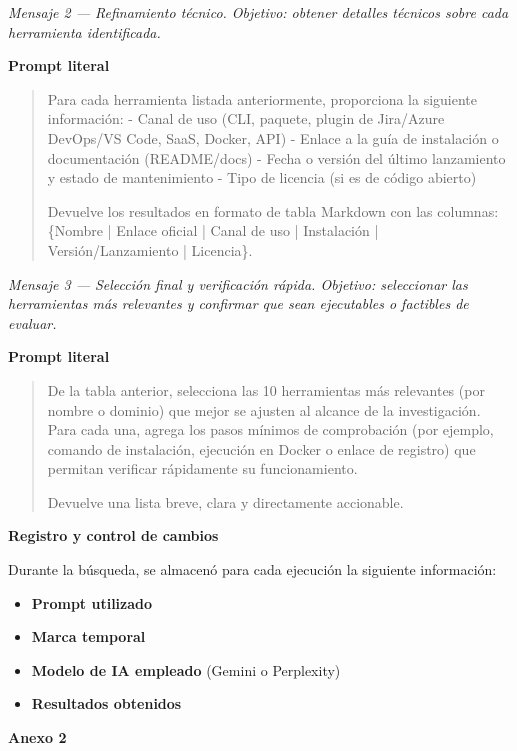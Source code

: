 \documentclass{prgrado}
\begin{document}
\textit{Mensaje 2 — Refinamiento técnico. Objetivo: obtener detalles técnicos sobre cada herramienta identificada.}
\par\textbf{Prompt literal}
\begin{quote}
Para cada herramienta listada anteriormente, proporciona la siguiente información:  
- Canal de uso (CLI, paquete, plugin de Jira/Azure DevOps/VS Code, SaaS, Docker, API)  
- Enlace a la guía de instalación o documentación (README/docs)  
- Fecha o versión del último lanzamiento y estado de mantenimiento  
- Tipo de licencia (si es de código abierto)  

Devuelve los resultados en formato de tabla Markdown con las columnas:  
\{Nombre | Enlace oficial | Canal de uso | Instalación | Versión/Lanzamiento | Licencia\}.
\end{quote}

\textit{Mensaje 3 — Selección final y verificación rápida. Objetivo: seleccionar las herramientas más relevantes y confirmar que sean ejecutables o factibles de evaluar.}
\par\textbf{Prompt literal}
\begin{quote}
De la tabla anterior, selecciona las 10 herramientas más relevantes (por nombre o dominio) que mejor se ajusten al alcance de la investigación.  
Para cada una, agrega los pasos mínimos de comprobación (por ejemplo, comando de instalación, ejecución en Docker o enlace de registro) que permitan verificar rápidamente su funcionamiento.  

Devuelve una lista breve, clara y directamente accionable.
\end{quote}

\medskip
\textbf{Registro y control de cambios}
\par Durante la búsqueda, se almacenó para cada ejecución la siguiente información:
\begin{itemize}
    \item \textbf{Prompt utilizado}
    \item \textbf{Marca temporal}
    \item \textbf{Modelo de IA empleado} (Gemini o Perplexity)
    \item \textbf{Resultados obtenidos}
\end{itemize}

\newpage
\vspace{0.75\baselineskip}
{\large\bfseries Anexo 2\par}
\vspace{0.25\baselineskip}
\end{document}
